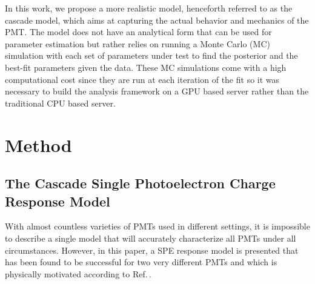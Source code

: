 \documentclass[11pt,a4paper]{article}
\newcommand\citeref[1]{Ref.\,\cite{#1}}
\begin{document}
In this work, we propose a more realistic model, henceforth referred to as the cascade model, which aims at capturing the actual behavior and mechanics of the PMT.  The model does not have an analytical form that can be used for parameter estimation but rather relies on running a Monte Carlo (MC) simulation with each set of parameters under test to find the posterior and the best-fit parameters given the data.  These MC simulations come with a high computational cost since they are run at each iteration of the fit so it was necessary to build the analysis framework on a GPU based server rather than the traditional CPU based server.


\section{\label{sec:level2}Method}


\subsection{\label{sec:level2-4}The Cascade Single Photoelectron Charge Response Model}

With almost countless varieties of PMTs used in different settings, it is impossible to describe a single model that will accurately characterize all PMTs under all circumstances.  However, in this paper, a SPE response model is presented that has been found to be successful for two very different PMTs and which is physically motivated according to \citeref{hammamatsu}.  %
\end{document}
